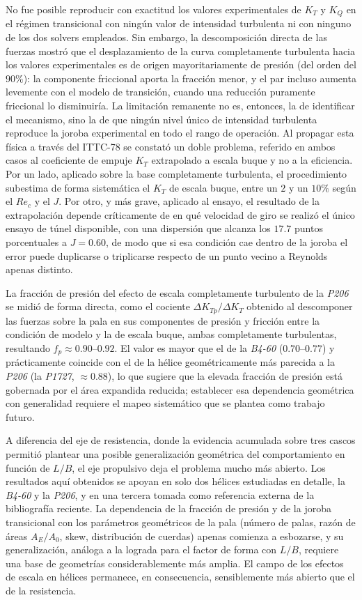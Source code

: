 No fue posible reproducir con exactitud los valores experimentales de $K_T$ y $K_Q$ en el régimen
transicional con ningún valor de intensidad turbulenta ni con ninguno de los dos
solvers empleados. Sin embargo, la descomposición directa de las fuerzas mostró que
el desplazamiento de la curva completamente turbulenta hacia los valores
experimentales es de origen mayoritariamente de presión (del orden del $90\%$): la
componente friccional aporta la fracción menor, y el par incluso aumenta levemente
con el modelo de transición, cuando una reducción puramente friccional lo disminuiría.
La limitación remanente no es, entonces, la de identificar el mecanismo, sino la de que
ningún nivel único de intensidad turbulenta reproduce la joroba experimental en todo el
rango de operación. Al propagar esta física a
través del ITTC-78 se constató un doble problema, referido en ambos casos al
coeficiente de empuje $K_T$ extrapolado a escala buque y no a la eficiencia. Por un
lado, aplicado sobre la base completamente turbulenta, el procedimiento subestima
de forma sistemática el $K_T$ de escala buque, entre un $2$ y un $10\%$ según el
$Re_c$ y el $J$. Por otro, y más grave, aplicado al ensayo, el resultado de la
extrapolación depende críticamente de en qué velocidad de giro se realizó el único
ensayo de túnel disponible, con una dispersión que alcanza los $17{.}7$ puntos
porcentuales a $J = 0{.}60$, de modo que si esa condición cae dentro de la joroba el
error puede duplicarse o triplicarse respecto de un punto vecino a Reynolds apenas
distinto.

La fracción de presión del efecto de escala completamente turbulento de la \textit{P206} se midió de forma directa, como el cociente $\Delta K_{Tp}/\Delta K_T$
obtenido al descomponer las fuerzas sobre la pala en sus componentes de presión y
fricción entre la condición de modelo y la de escala buque, ambas completamente
turbulentas, resultando $f_p \approx 0{.}90$--$0{.}92$. El valor es mayor que el de la
\textit{B4-60} ($0{.}70$--$0{.}77$) y prácticamente coincide con el de la hélice geométricamente
más parecida a la \textit{P206} (la \textit{P1727}, $\approx 0{.}88$), lo que sugiere que la
elevada fracción de presión está gobernada por el área expandida reducida; establecer
esa dependencia geométrica con generalidad requiere el mapeo sistemático que se plantea
como trabajo futuro.

A diferencia del eje de resistencia, donde la evidencia acumulada sobre tres cascos
permitió plantear una posible generalización geométrica del comportamiento en función de
$L/B$, el eje propulsivo deja el problema mucho más abierto. Los resultados aquí
obtenidos se apoyan en solo dos hélices estudiadas en detalle, la \textit{B4-60} y la \textit{P206}, y en una tercera tomada como referencia externa de la bibliografía
reciente. La dependencia de la fracción de presión y de la joroba transicional con
los parámetros geométricos de la pala (número de palas, razón de áreas $A_E/A_0$,
skew, distribución de cuerdas) apenas comienza a esbozarse, y su generalización,
análoga a la lograda para el factor de forma con $L/B$, requiere una base de
geometrías considerablemente más amplia. El campo de los efectos de escala en
hélices permanece, en consecuencia, sensiblemente más abierto que el de la
resistencia.

